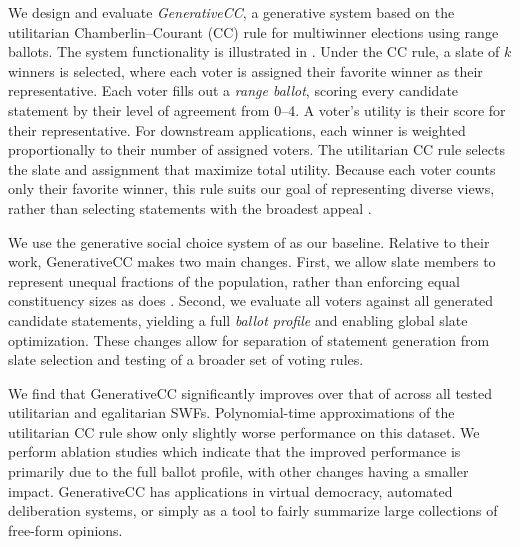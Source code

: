 \documentclass[letterpaper]{article} %
\begin{document}
We design and evaluate \emph{GenerativeCC}, a generative system based on the utilitarian Chamberlin--Courant (CC) rule for multiwinner elections \citep{chamberlin-courant} using range ballots.
The system functionality is illustrated in .
Under the CC rule, a slate of \(k\) winners is selected, where each voter is assigned their favorite winner as their representative.
Each voter fills out a \emph{range ballot}, scoring every candidate statement by their level of agreement from 0--4.
A voter's utility is their score for their representative.
For downstream applications, each winner is weighted proportionally to their number of assigned voters.
The utilitarian CC rule selects the slate and assignment that maximize total utility.
Because each voter counts only their favorite winner, this rule suits our goal of representing diverse views, rather than selecting statements with the broadest appeal \citep{faliszewski-multiwinner-2017, lu-boutilier-2011}.

We use the generative social choice system of \citet{fish-v2} as our baseline.
Relative to their work, GenerativeCC makes two main changes.
First, we allow slate members to represent unequal fractions of the population, rather than enforcing equal constituency sizes as does \citet{monroe-1995}.
Second, we evaluate all voters against all generated candidate statements, yielding a full \emph{ballot profile} and enabling global slate optimization.
These changes allow for separation of statement generation from slate selection and testing of a broader set of voting rules.

We find that GenerativeCC significantly improves over that of \citet{fish-v2} across all tested utilitarian and egalitarian SWFs.
Polynomial-time approximations of the utilitarian CC rule show only slightly worse performance on this dataset.
We perform ablation studies which indicate that the improved performance is primarily due to the full ballot profile, with other changes having a smaller impact.
GenerativeCC has applications in virtual democracy, automated deliberation systems, or simply as a tool to fairly summarize large collections of free-form opinions.
\end{document}
